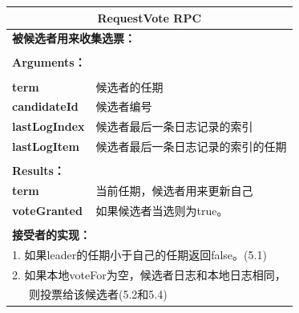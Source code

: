 \documentclass[journal]{IEEEtran}
\begin{document}
\begin{table}[htp]
\begin{center}
\begin{tabular}{|p{2cm}p{6cm}|}
\hline
\multicolumn{2}{|c|}{\textbf{RequestVote RPC}}  \\
\hline
\multicolumn{2}{|l|}{\textbf{被候选者用来收集选票：}} \\
&\\
\multicolumn{2}{|l|}{\textbf{Arguments：}} \\
&\\
\textbf{term} & 候选者的任期\\
\textbf{candidateId} & 候选者编号\\
\textbf{lastLogIndex} & 候选者最后一条日志记录的索引 \\ 
\textbf{lastLogItem} & 候选者最后一条日志记录的索引的任期 \\
&\\
\multicolumn{2}{|l|}{\textbf{Results：}} \\
\textbf{term} & 当前任期，候选者用来更新自己\\
\textbf{voteGranted} & 如果候选者当选则为true。\\
&\\
\multicolumn{2}{|l|}{\textbf{接受者的实现：}} \\
\multicolumn{2}{|l|}{1. 如果leader的任期小于自己的任期返回false。(5.1)} \\
\multicolumn{2}{|l|}{2. 如果本地voteFor为空，候选者日志和本地日志相同，} \\
\multicolumn{2}{|l|}{\ \ \ 则投票给该候选者(5.2和5.4)}\\
\hline
\end{tabular}
\end{center}
\label{default}
\end{table}%
\end{document}

